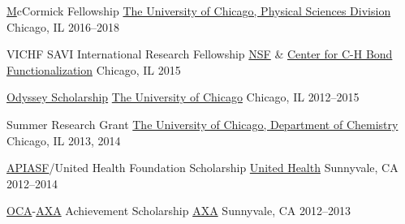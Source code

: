 


\begin{cvhonors}

	\cvhonor
		{\href{https://chemistry.uchicago.edu/phd-financial-support}McCormick Fellowship} %
		{\href{https://physical-sciences.uchicago.edu/}{The University of Chicago, Physical Sciences Division}} %
		{Chicago, IL} %
		{2016--2018} %
   
	\cvhonor
		{VICHF SAVI International Research Fellowship} %
		{\href{https://www.nsf.gov/awardsearch/showAward?AWD_ID=1205646}{NSF} \& \href{http://nsf-cchf.com/vichf/2015-cohort/}{Center for C-H Bond Functionalization}} %
		{Chicago, IL} %
		{2015} %
	
		
	\cvhonor
		{\href{https://financialaid.uchicago.edu/undergraduate/types-aid/scholarships/odyssey-scholarships}{Odyssey Scholarship}} %
		{\href{https://www.uchicago.edu}{The University of Chicago}} %
		{Chicago, IL} %
		{2012--2015} %
	
	\cvhonor
		{Summer Research Grant} %
		{\href{https://chemistry.uchicago.edu}{The University of Chicago, Department of Chemistry}} %
		{Chicago, IL} %
		{2013, 2014} %

	\cvhonor
		{\href{http://www.apiasf.org}{APIASF}/United Health Foundation Scholarship} %
		{\href{http://www.unitedhealthgroup.com}{United Health}} %
		{Sunnyvale, CA} %
		{2012--2014} %
		
	\cvhonor
		{\href{https://www.ocanational.org}{OCA}-\href{https://us.axa.com/home.html}{\href{https://us.axa.com/}{AXA}} Achievement Scholarship} %
		{\href{https://us.axa.com/axa-foundation/AXA-achievement-scholarship.html}{AXA}} %
		{Sunnyvale, CA} %
		{2012--2013} %
		

\end{cvhonors}
